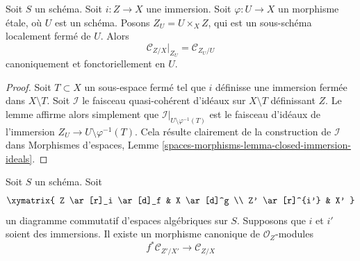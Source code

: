 \begin{lemma}
\label{lemma-etale-conormal}
Soit $S$ un schéma. Soit $i : Z \to X$ une immersion.
Soit $\varphi : U \to X$ un morphisme étale, où $U$ est un schéma.
Posons $Z_U = U \times_X Z$, qui est un sous-schéma localement fermé de $U$.
Alors
$$
\mathcal{C}_{Z/X}|_{Z_U} = \mathcal{C}_{Z_U/U}
$$
canoniquement et fonctoriellement en $U$.
\end{lemma}

\begin{proof}
Soit $T \subset X$ un sous-espace fermé tel que $i$ définisse une immersion
fermée dans $X \setminus T$.
Soit $\mathcal{I}$ le faisceau quasi-cohérent d'idéaux sur
$X \setminus T$ définissant $Z$. Le lemme affirme alors simplement que
$\mathcal{I}|_{U \setminus \varphi^{-1}(T)}$ est le faisceau d'idéaux de
l'immersion $Z_U \to U \setminus \varphi^{-1}(T)$.
Cela résulte clairement de la construction de $\mathcal{I}$ dans
Morphismes d'espaces, Lemme \ref{spaces-morphisms-lemma-closed-immersion-ideals}.
\end{proof}

\begin{lemma}
\label{lemma-conormal-functorial}
Soit $S$ un schéma. Soit
$$
\xymatrix{
Z \ar[r]_i \ar[d]_f & X \ar[d]^g \\
Z' \ar[r]^{i'} & X'
}
$$
un diagramme commutatif d'espaces algébriques sur $S$.
Supposons que $i$ et $i'$ soient des immersions. Il existe un morphisme canonique
de $\mathcal{O}_Z$-modules
$$
f^*\mathcal{C}_{Z'/X'}
\longrightarrow
\mathcal{C}_{Z/X}
$$
\end{lemma}

